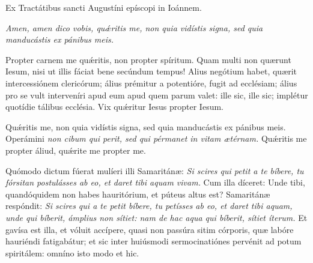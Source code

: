 {

\noindent Ex Tractátibus sancti Augustíni epíscopi in Ioánnem.

\noindent \emph{Amen, amen dico vobis, quǽritis me, non quia vidístis signa, sed quia manducástis ex pánibus meis.} 

\noindent Propter carnem me quǽritis, non propter spíritum. Quam multi non quærunt Iesum, nisi ut illis fáciat bene secúndum tempus! Alius negótium habet, quærit intercessiónem clericórum; álius prémitur a potentióre, fugit ad ecclésiam; álius pro se vult interveníri apud eum apud quem parum valet: ille sic, ille sic; implétur quotídie tálibus ecclésia. Vix quǽritur Iesus propter Iesum. 

\noindent Quǽritis me, non quia vidístis signa, sed quia manducástis ex pánibus meis. Operámini \emph{non cibum qui perit, sed qui pérmanet in vitam ætérnam.} Quǽritis me propter áliud, quǽrite me propter me. 

\noindent Quómodo dictum fúerat mulíeri illi Samaritánæ: \emph{Si scires qui petit a te bíbere, tu fórsitan postulásses ab eo, et daret tibi aquam vivam.} Cum illa díceret: Unde tibi, quandóquidem non habes hauritórium, et púteus altus est? Samaritánæ respóndit: \emph{Si scires qui a te petit bíbere, tu petísses ab eo, et daret tibi aquam, unde qui bíberit, ámplius non sítiet: nam de hac aqua qui bíberit, sítiet íterum.} Et gavísa est illa, et vóluit accípere, quasi non passúra sitim córporis, quæ labóre hauriéndi fatigabátur; et sic inter huiúsmodi sermocinatiónes pervénit ad potum spiritálem: omníno isto modo et hic.

\vfill
\pagebreak

 

\vspace{-5mm}


\vfill
\pagebreak
}
\newcommand{\benedictus}{\pars{Canticum Zachariæ.} \scriptura{Io. 6, 27}

\vspace{-4mm}

\antiphona{VIII G}{temporalia/ant-operamininoncibum.gtex}

\vspace{-2mm}

\scriptura{Lc. 1, 68-79}

\vspace{-2mm}

\cantusSineNeumas
\initiumpsalmi{temporalia/benedictus-initium-viiisoll-G-auto.gtex}


 \Abardot{}}



